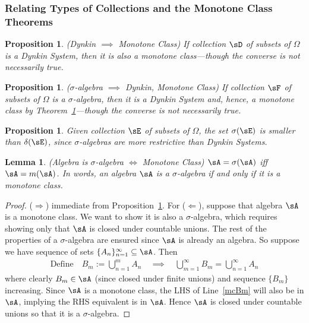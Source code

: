 \documentclass[12pt]{article}
\theoremstyle{plain}
\newtheorem{lem}[thm]{Lemma}
\newtheorem{prop}[thm]{Proposition}
\theoremstyle{definition}
\theoremstyle{remark}
\newcommand{\ninf}{_{n=1}^\infty}
\newcommand{\minf}{_{m=1}^\infty}
\begin{document}

\clearpage
\subsubsection{Relating Types of Collections and the Monotone Class Theorems}

\begin{prop}\emph{(Dynkin $\implies$ Monotone Class)}
\label{prop:sal-mc}
If collection $\sD$ of subsets of $\Omega$ is a Dynkin System, then
it is also a monotone class---though the converse is not
necessarily true.
\end{prop}

\begin{prop}\emph{($\sigma$-algebra $\implies$ Dynkin, Monotone Class)}
\label{prop:sal-d}
If collection $\sF$ of subsets of $\Omega$ is a $\sigma$-algebra, then
it is a Dynkin System and, hence, a monotone class by
Theorem~\ref{prop:sal-mc}---though the converse is not necessarily true.
\end{prop}

\begin{prop}
Given collection $\sE$ of subsets of $\Omega$, the set $\sigma(\sE)$ is
smaller than $\delta(\sE)$, since $\sigma$-algebras are more
restrictive than Dynkin Systems.
\end{prop}


\begin{lem}\emph{(Algebra is $\sigma$-algebra $\iff$ Monotone Class)}
\label{lem:alg-sigal-mc}
$\sA=\sigma(\sA)$ iff $\sA=m(\sA)$.
In words, an algebra $\sA$ is a $\sigma$-algebra if and only if it is a
monotone class.
\end{lem}
\begin{proof}
($\Rightarrow$) immediate from Proposition~\ref{prop:sal-d}.
For ($\Leftarrow$), suppose that algebra $\sA$ is a
monotone class. We want to show it is also a $\sigma$-algebra, which
requires showing only that $\sA$ is closed under countable unions. The
rest of the properties of a $\sigma$-algebra are ensured since $\sA$ is
already an algebra.
So suppose we have sequence of sets
$\{A_n\}\ninf\subseteq\sA$.
Then
\begin{align}
  \text{Define}\quad
  B_m := \bigcup_{n=1}^m A_n
  \quad\implies\quad
  \bigcup\minf B_m = \bigcup\ninf A_n
  \label{mcBm}
\end{align}
where clearly $B_m \in \sA$ (since closed under finite unions)
and sequence $\{B_m\}$ increasing. Since $\sA$ is a
monotone class, the LHS of Line~\ref{mcBm} will also be in $\sA$,
implying the RHS equivalent is in $\sA$. Hence $\sA$ is closed under
countable unions so that it is a $\sigma$-algebra.
\end{proof}
\end{document}
